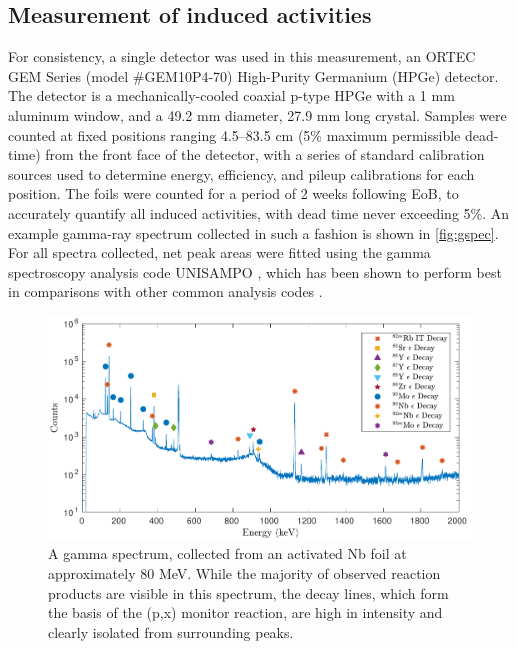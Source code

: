 \documentclass[%
 reprint,
superscriptaddress,
onecolumn,
linenumbers,
notitlepage,
 amsmath,amssymb,
 aps,
prc,
]{revtex4-1}
\begin{document}
\subsection{Measurement of induced activities}\label{sec:spectroscopy}


For consistency, a single detector was used in this measurement, an ORTEC GEM Series (model \#GEM10P4-70)  High-Purity Germanium (HPGe) detector.
The detector is a mechanically-cooled coaxial p-type HPGe with a 1 mm aluminum window, and a 49.2 mm diameter, 27.9 mm long crystal.
Samples were counted at fixed positions ranging 4.5--83.5  cm (5\% maximum permissible dead-time) from the front face of the detector, with a series of standard calibration sources used to determine energy, efficiency, and pileup calibrations for each position.
The foils were counted  for a period of 2 weeks following EoB, to accurately quantify all induced activities,  with dead time never exceeding 5\%.
An example gamma-ray spectrum collected in such a fashion is shown in \autoref{fig:gspec}.
For all spectra collected, net peak areas were fitted using the gamma spectroscopy analysis code UNISAMPO \cite{Aarnio2001}, which has been shown to perform best in comparisons with other common analysis codes \cite{Jackman2014}.

\begin{figure}
 \centering
 \includegraphics[width=6in]{./figures/sample_gspec.pdf}
 \caption{A gamma spectrum, collected from an activated Nb foil at approximately 80 MeV. While the majority of observed reaction products are visible in this spectrum,  the  decay lines, which form the basis of the (p,x) monitor reaction, are high in intensity and clearly isolated from surrounding peaks.}
 \label{fig:gspec}
\end{figure}
\end{document}
